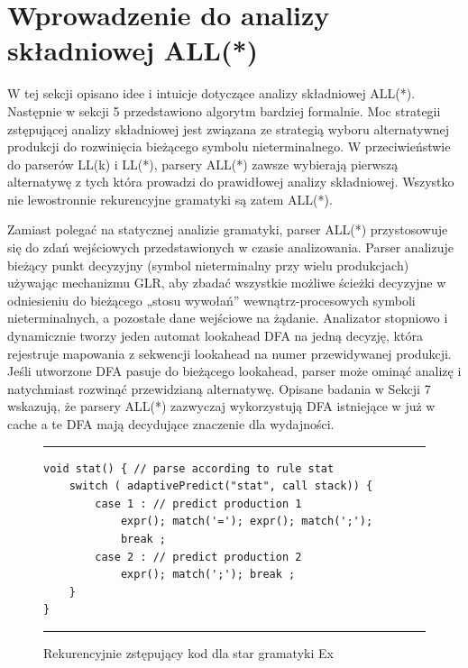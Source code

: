﻿\section{Wprowadzenie do analizy składniowej ALL(*)}
W tej sekcji opisano idee i intuicje dotyczące analizy składniowej ALL(*).
Następnie w sekcji 5 przedstawiono algorytm bardziej formalnie.
Moc strategii zstępującej analizy składniowej jest związana ze strategią wyboru
alternatywnej produkcji do rozwinięcia bieżącego symbolu nieterminalnego.
W przeciwieństwie do parserów LL(k) i LL(*), parsery ALL(*) zawsze wybierają
pierwszą alternatywę z tych która prowadzi do prawidłowej analizy składniowej.
Wszystko nie lewostronnie rekurencyjne gramatyki są zatem ALL(*).
\par
Zamiast polegać na statycznej analizie gramatyki,
parser ALL(*) przystosowuje się do zdań wejściowych przedstawionych w czasie analizowania.
Parser analizuje bieżący punkt decyzyjny (symbol nieterminalny przy wielu produkcjach)
używając mechanizmu GLR, aby zbadać wszystkie możliwe ścieżki decyzyjne
w odniesieniu do bieżącego „stosu wywołań” wewnątrz-procesowych symboli nieterminalnych,
a pozostałe dane wejściowe na żądanie. Analizator stopniowo i dynamicznie
tworzy jeden automat lookahead DFA na jedną decyzję, która rejestruje mapowania
z sekwencji lookahead na numer przewidywanej produkcji.
Jeśli utworzone DFA pasuje do bieżącego lookahead, parser może ominąć analizę
i natychmiast rozwinąć przewidzianą alternatywę.
Opisane badania w Sekcji 7 wskazują, że parsery ALL(*) zazwyczaj wykorzystują
DFA istniejące w już w cache a te DFA mają decydujące znaczenie dla wydajności. 

\begin{figure}[!ht]
\noindent\rule{\linewidth}{0.3pt}
\begin{lstlisting}
void stat() { // parse according to rule stat
	switch ( adaptivePredict("stat", call stack)) {
		case 1 : // predict production 1
			expr(); match('='); expr(); match(';');
			break ;
		case 2 : // predict production 2
			expr(); match(';'); break ;
	}
}
\end{lstlisting}
\noindent\rule{\linewidth}{0.3pt}
\caption{Rekurencyjnie zstępujący kod dla star gramatyki Ex}
\end{figure}


